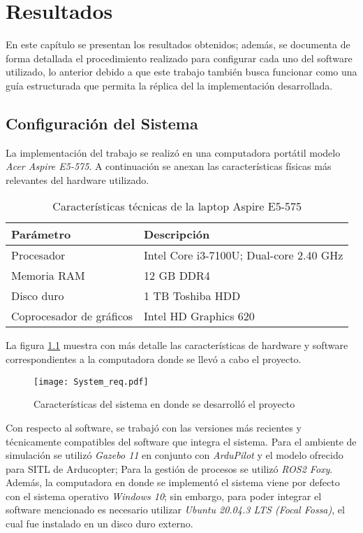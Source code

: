 \chapter{Resultados}

En este capítulo se presentan los resultados obtenidos; además, se documenta de forma detallada el procedimiento realizado para configurar cada uno del software utilizado, lo anterior debido a que este trabajo también busca funcionar como una guía estructurada que permita la réplica del la implementación desarrollada.

\section{Configuración del Sistema}
La implementación del trabajo se realizó en una computadora portátil modelo \textit{Acer Aspire E5-575}. A continuación se anexan las características físicas más relevantes del hardware utilizado.

\begin{table}
    \centering
    \begin{tabular}{||l|l||}
        \hline
        Parámetro & Descripción\\
        \hline
        Procesador & Intel Core i3-7100U; Dual-core 2.40 GHz\\
        Memoria RAM & 12 GB DDR4\\
        Disco duro & 1 TB Toshiba HDD\\
        Coprocesador de gráficos & Intel HD Graphics 620\\
        \hline
    \end{tabular}
    \caption{Características técnicas de la laptop Aspire E5-575}
    \label{tab:specs}
\end{table}

La figura \ref{fig:req} muestra con más detalle las características de hardware y software correspondientes a la computadora donde se llevó a cabo el proyecto. 

\begin{figure}[ht]
    \centering
    \texttt{[image: System\_req.pdf]}
    \caption{Características del sistema en donde se desarrolló el proyecto}
    \label{fig:req}
\end{figure}

Con respecto al software, se trabajó con las versiones más recientes y técnicamente compatibles del software que integra el sistema. Para el ambiente de simulación se utilizó \textit{Gazebo 11} en conjunto con \textit{ArduPilot} y el modelo ofrecido para SITL de Arducopter; Para la gestión de procesos se utilizó \textit{ROS2 Foxy}. Además, la computadora en donde se implementó el sistema viene por defecto con el sistema operativo \textit{Windows 10}; sin embargo, para poder integrar el software mencionado es necesario utilizar \textit{Ubuntu 20.04.3 LTS (Focal Fossa)}, el cual fue instalado en un disco duro externo.

